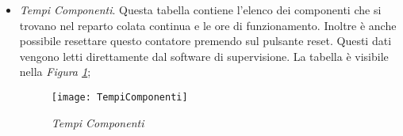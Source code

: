 \begin{itemize}
    \item \textit{Tempi Componenti}. Questa tabella contiene l'elenco dei componenti che si trovano nel reparto colata continua
    e le ore di funzionamento. Inoltre è anche possibile resettare questo contatore premendo sul pulsante reset. Questi dati
    vengono letti direttamente dal software di supervisione. La tabella è visibile nella \textit{Figura \ref{fig:TempiComponenti}};

    \begin{figure}[H]
      \texttt{[image: TempiComponenti]}
      \centering
      \caption{\textit{Tempi Componenti}}
      \label{fig:TempiComponenti}
    \end{figure}

  \end{itemize}

